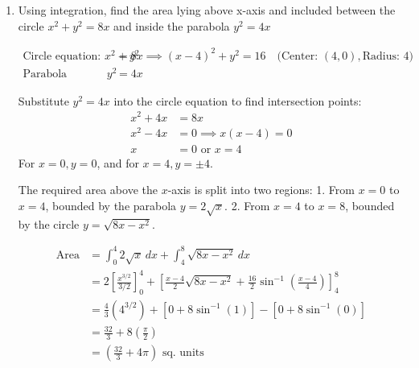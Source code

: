 \begin{enumerate}[label=\thesubsection.\arabic*, ref=\thesubsection.\theenumi]
$$\frac{dS}{dr} = 0$$:
\begin{align*}
2\pi r - \frac{250\pi}{r^2} &= 0 \\
2\pi r^3 &= 250\pi \\
r^3 &= 125 \implies r = 5\text{ cm}
\end{align*}

Second derivative test:
\begin{align*}
\frac{d^2S}{dr^2} &= 2\pi + \frac{500\pi}{r^3}
\end{align*}
At $r = 5$:
\begin{align*}
\left.\frac{d^2S}{dr^2}\right|_{r=5} &= 2\pi + \frac{500\pi}{125} = 2\pi + 4\pi = 6\pi > 0
\end{align*}
the surface area is minimum when $r = 5\text{ cm}$.

Corresponding height:
\begin{align*}
h &= \frac{125}{(5)^2} = \frac{125}{25} = 5\text{ cm}
\end{align*}

Radius $r = 5\text{ cm}$ and Height $h = 5\text{ cm}$.

\item

Using integration, find the area lying above x-axis and included between the circle $x^{2}+y^{2}=8x$ and inside the parabola $y^{2}=4x$

\solution 

\begin{align*}
\text{Circle equation: } x^2 + y^2 &= 8x \implies (x-4)^2 + y^2 = 16 \quad \text{(Center: }(4,0), \text{Radius: } 4) \\
\text{Parabola equation: } y^2 &= 4x
\end{align*}

Substitute $y^2 = 4x$ into the circle equation to find intersection points:
\begin{align*}
x^2 + 4x &= 8x \\
x^2 - 4x &= 0 \implies x(x-4) = 0 \\
x &= 0 \text{ or } x = 4
\end{align*}
For $x = 0, y = 0$, and for $x = 4, y = \pm 4$.

The required area above the $x$-axis is split into two regions:
1. From $x = 0$ to $x = 4$, bounded by the parabola $y = 2\sqrt{x}$.
2. From $x = 4$ to $x = 8$, bounded by the circle $y = \sqrt{8x - x^2}$.

\begin{align*}
\text{Area} &= \int_{0}^{4} 2\sqrt{x}\,dx + \int_{4}^{8} \sqrt{8x - x^2}\,dx \\
&= 2 \left[ \frac{x^{3/2}}{3/2} \right]_{0}^{4} + \left[ \frac{x-4}{2}\sqrt{8x-x^2} + \frac{16}{2}\sin^{-1}\left(\frac{x-4}{4}\right) \right]_{4}^{8} \\
&= \frac{4}{3}(4^{3/2}) + \left[ 0 + 8\sin^{-1}(1) \right] - \left[ 0 + 8\sin^{-1}(0) \right] \\
&= \frac{32}{3} + 8\left(\frac{\pi}{2}\right) \\
&= \left(\frac{32}{3} + 4\pi\right) \text{ sq. units}
\end{align*}


\end{enumerate}
